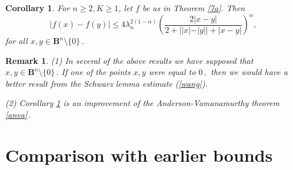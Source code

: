 \documentclass[12pt,a4paper,leqno]{amsart}
\theoremstyle{plain}
\newtheorem{corollary}[equation]{Corollary}
\newtheorem{remark}[equation]{Remark}
\numberwithin{equation}{section}          %
\begin{document}
\begin{corollary}\label{13} For $n\geq 2, K\geq 1$, let $f$ be as in Theorem \ref{7a}. Then
\begin{equation}\label{14}
|f(x)-f(y)| \leq  4 \lambda_n^{2(1-\alpha)}
\left(\frac{2|x-y|}{2+||x|-|y||+|x-y|}\right)^\alpha,
\end{equation}
for all $x,y\in \mathbf{B}^n \setminus \{0 \}\,.$
\end{corollary}


\begin{remark}{\rm (1) In several of the above results we have supposed that
$x,y\in \mathbf{B}^n \setminus \{0 \}\,.$ If one of the points $x,y$ were equal to
$0\,,$ then we would have a better result from the Schwarz lemma
estimate (\ref{wang}).

(2) Corollary \ref{13} is an improvement of the Anderson-Vamanamurthy theorem \ref{anva}\,. }
\end{remark}

\section{\sc Comparison with earlier bounds}
\end{document}
